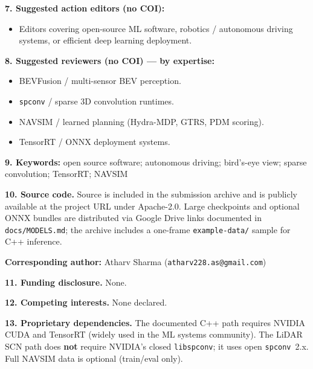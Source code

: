 \documentclass[11pt]{article}
\begin{document}
\medskip
\noindent\textbf{7. Suggested action editors (no COI):}
\begin{itemize}
  \item Editors covering open-source ML software, robotics / autonomous driving systems, or efficient deep learning deployment.
\end{itemize}

\medskip
\noindent\textbf{8. Suggested reviewers (no COI) --- by expertise:}
\begin{itemize}
  \item BEVFusion / multi-sensor BEV perception.
  \item \texttt{spconv} / sparse 3D convolution runtimes.
  \item NAVSIM / learned planning (Hydra-MDP, GTRS, PDM scoring).
  \item TensorRT / ONNX deployment systems.
\end{itemize}

\medskip
\noindent\textbf{9. Keywords:} open source software; autonomous driving; bird's-eye view; sparse convolution; TensorRT; NAVSIM

\medskip
\noindent\textbf{10. Source code.} Source is included in the submission archive and is publicly available at the project URL under Apache-2.0. Large checkpoints and optional ONNX bundles are distributed via Google Drive links documented in \texttt{docs/MODELS.md}; the archive includes a one-frame \texttt{example-data/} sample for C++ inference.

\medskip
\noindent\textbf{Corresponding author:} Atharv Sharma (\texttt{atharv228.as@gmail.com})

\medskip
\noindent\textbf{11. Funding disclosure.} None.

\medskip
\noindent\textbf{12. Competing interests.} None declared.

\medskip
\noindent\textbf{13. Proprietary dependencies.} The documented C++ path requires NVIDIA CUDA and TensorRT (widely used in the ML systems community). The LiDAR SCN path does \textbf{not} require NVIDIA's closed \texttt{libspconv}; it uses open \texttt{spconv}~2.x. Full NAVSIM data is optional (train/eval only).
\end{document}
